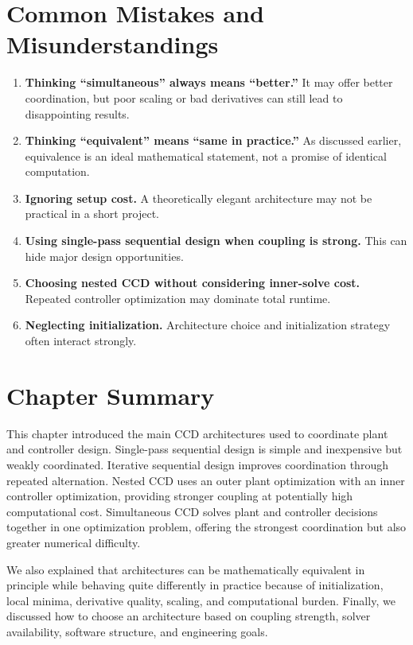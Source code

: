 \documentclass[11pt]{article}
\begin{document}
\section{Common Mistakes and Misunderstandings}

\begin{enumerate}[leftmargin=1.5em]
  \item \textbf{Thinking ``simultaneous'' always means ``better.''} It may offer better coordination, but poor scaling or bad derivatives can still lead to disappointing results.
  \item \textbf{Thinking ``equivalent'' means ``same in practice.''} As discussed earlier, equivalence is an ideal mathematical statement, not a promise of identical computation.
  \item \textbf{Ignoring setup cost.} A theoretically elegant architecture may not be practical in a short project.
  \item \textbf{Using single-pass sequential design when coupling is strong.} This can hide major design opportunities.
  \item \textbf{Choosing nested CCD without considering inner-solve cost.} Repeated controller optimization may dominate total runtime.
  \item \textbf{Neglecting initialization.} Architecture choice and initialization strategy often interact strongly.
\end{enumerate}

\section{Chapter Summary}

This chapter introduced the main CCD architectures used to coordinate plant and controller design. Single-pass sequential design is simple and inexpensive but weakly coordinated. Iterative sequential design improves coordination through repeated alternation. Nested CCD uses an outer plant optimization with an inner controller optimization, providing stronger coupling at potentially high computational cost. Simultaneous CCD solves plant and controller decisions together in one optimization problem, offering the strongest coordination but also greater numerical difficulty.

We also explained that architectures can be mathematically equivalent in principle while behaving quite differently in practice because of initialization, local minima, derivative quality, scaling, and computational burden. Finally, we discussed how to choose an architecture based on coupling strength, solver availability, software structure, and engineering goals.
\end{document}
